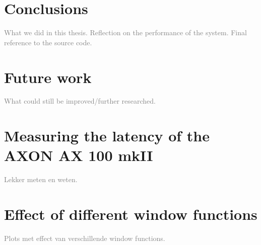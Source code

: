 \documentclass[10pt,twocolumn]{article}
\begin{document}
\section{Conclusions}
\textcolor{gray}{What we did in this thesis. Reflection on the performance of the system. Final reference to the source code.}


\section{Future work}  \label{sec:future}
\textcolor{gray}{What could still be improved/further researched.}



\appendix
\section{Measuring the latency of the AXON AX 100 mkII}  \label{sec:ax100}
\textcolor{gray}{Lekker meten en weten.}

\section{Effect of different window functions}
\textcolor{gray}{Plots met effect van verschillende window functions.}



% 

\end{document}

